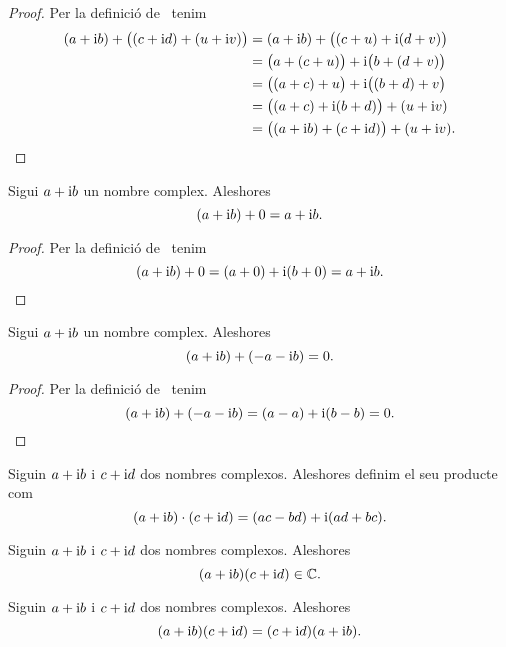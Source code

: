 \documentclass[../Apunts.tex]{subfiles}
\begin{document}
	\begin{proof}
		Per la definició de~ tenim
		\begin{align*}
			(a+\mathrm{i} b)+\big((c+\mathrm{i} d)+(u+\mathrm{i} v)\big)&=(a+\mathrm{i} b)+\big((c+u)+\mathrm{i}(d+v)\big) \\
			&=\big(a+(c+u)\big)+\mathrm{i}\big(b+(d+v)\big) \\
			&=\big((a+c)+u\big)+\mathrm{i}\big((b+d)+v\big) \\
			&=\big((a+c)+\mathrm{i}(b+d)\big)+(u+\mathrm{i} v) \\
			&=\big((a+\mathrm{i} b)+(c+\mathrm{i} d)\big)+(u+\mathrm{i} v).\qedhere
		\end{align*}
	\end{proof}
	\begin{proposition}
		\label{prop:element neutre per la suma dels complexos}
		Sigui \(a+\mathrm{i} b\) un nombre complex. Aleshores
		\[(a+\mathrm{i} b)+0=a+\mathrm{i} b.\]
	\end{proposition}
	\begin{proof}
		Per la definició de~ tenim
		\[(a+\mathrm{i} b)+0=(a+0)+\mathrm{i}(b+0)=a+\mathrm{i} b.\qedhere\]
	\end{proof}
	\begin{proposition}
		\label{prop:element invers per la suma dels complexos}
		Sigui \(a+\mathrm{i} b\) un nombre complex. Aleshores
		\[(a+\mathrm{i} b)+(-a-\mathrm{i} b)=0.\]
	\end{proposition}
	\begin{proof}
		Per la definició de~ tenim
		\[(a+\mathrm{i} b)+(-a-\mathrm{i} b)=(a-a)+\mathrm{i}(b-b)=0.\qedhere\]
	\end{proof}
	\begin{definition}
		\label{def:producte de nombres complexos}
		Siguin \(a+\mathrm{i} b\) i \(c+\mathrm{i} d\) dos nombres complexos. Aleshores definim el seu producte com
		\[(a+\mathrm{i} b)\cdot(c+\mathrm{i} d)=(ac-bd)+\mathrm{i}(ad+bc).\]
	\end{definition}
	\begin{observation}
		\label{obs:els nombres complexos estan tancats pel producte}
		Siguin \(a+\mathrm{i} b\) i \(c+\mathrm{i} d\) dos nombres complexos. Aleshores
		\[(a+\mathrm{i} b)(c+\mathrm{i} d)\in\mathbb{C}.\]
	\end{observation}
	\begin{proposition}
		\label{prop:els nombres complexos commuten pel producte}
		Siguin \(a+\mathrm{i} b\) i \(c+\mathrm{i} d\) dos nombres complexos. Aleshores
		\[(a+\mathrm{i} b)(c+\mathrm{i} d)=(c+\mathrm{i} d)(a+\mathrm{i} b).\]
	\end{proposition}
\end{document}
